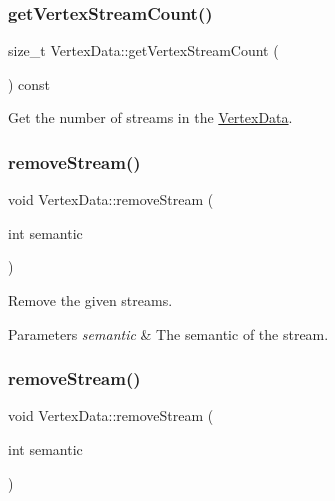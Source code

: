 \subsubsection{\texorpdfstring{get\+Vertex\+Stream\+Count()}{getVertexStreamCount()}\hspace{0.1cm}{\footnotesize\ttfamily [2/2]}}
{\footnotesize\ttfamily size\+\_\+t Vertex\+Data\+::get\+Vertex\+Stream\+Count (\begin{DoxyParamCaption}{ }\end{DoxyParamCaption}) const}

Get the number of streams in the \hyperlink{classVertexData}{Vertex\+Data}. \mbox{\label{classVertexData_a80e806241d648894e1e9992d863e20b6}} 
\subsubsection{\texorpdfstring{remove\+Stream()}{removeStream()}\hspace{0.1cm}{\footnotesize\ttfamily [1/2]}}
{\footnotesize\ttfamily void Vertex\+Data\+::remove\+Stream (\begin{DoxyParamCaption}\item[{int}]{semantic }\end{DoxyParamCaption})}

Remove the given streams. 
\begin{DoxyParams}{Parameters}
{\em semantic} & The semantic of the stream. \\
\hline
\end{DoxyParams}
\mbox{\label{classVertexData_a80e806241d648894e1e9992d863e20b6}} 
\subsubsection{\texorpdfstring{remove\+Stream()}{removeStream()}\hspace{0.1cm}{\footnotesize\ttfamily [2/2]}}
{\footnotesize\ttfamily void Vertex\+Data\+::remove\+Stream (\begin{DoxyParamCaption}\item[{int}]{semantic }\end{DoxyParamCaption})}


